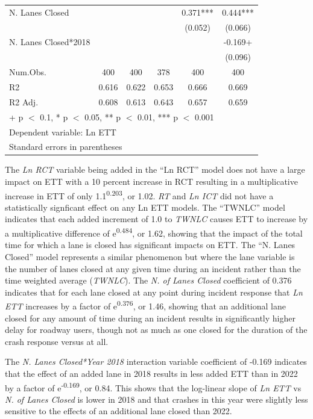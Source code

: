 \documentclass[
  letterpaper,
  authoryear]{elsarticle}
\begin{document}
\begin{table}
{\begin{tabular}[t]{lccccc}
N. Lanes Closed &  &  &  & 0.371*** & 0.444***\\
 &  &  &  & (0.052) & (0.066)\\
N. Lanes Closed*2018 &  &  &  &  & -0.169+\\
 &  &  &  &  & (0.096)\\
\midrule
Num.Obs. & 400 & 400 & 378 & 400 & 400\\
R2 & 0.616 & 0.622 & 0.653 & 0.666 & 0.669\\
R2 Adj. & 0.608 & 0.613 & 0.643 & 0.657 & 0.659\\
\bottomrule
\multicolumn{6}{l}{\rule{0pt}{1em}+ p $<$ 0.1, * p $<$ 0.05, ** p $<$ 0.01, *** p $<$ 0.001}\\
\multicolumn{6}{l}{\rule{0pt}{1em}Dependent variable: Ln ETT}\\
\multicolumn{6}{l}{\rule{0pt}{1em}Standard errors in parentheses}\\
\end{tabular}

}

\end{table}%

The \emph{Ln RCT} variable being added in the ``Ln RCT'' model does not
have a large impact on ETT with a 10 percent increase in RCT resulting
in a multiplicative increase in ETT of only 1.1\textsuperscript{0.203},
or 1.02. \emph{RT} and \emph{Ln ICT} did not have a statistically
signficant effect on any Ln ETT models. The ``TWNLC'' model indicates
that each added increment of 1.0 to \emph{TWNLC} causes ETT to increase
by a multiplicative difference of e\textsuperscript{0.484}, or 1.62,
showing that the impact of the total time for which a lane is closed has
significant impacts on ETT. The ``N. Lanes Closed'' model represents a
similar phenomenon but where the lane variable is the number of lanes
closed at any given time during an incident rather than the time
weighted average (\emph{TWNLC}). The \emph{N. of Lanes Closed}
coefficient of 0.376 indicates that for each lane closed at any point
during incident response that \emph{Ln ETT} increases by a factor of
e\textsuperscript{0.376}, or 1.46, showing that an additional lane
closed for any amount of time during an incident results in
significantly higher delay for roadway users, though not as much as one
closed for the duration of the crash response versus at all.

The \emph{N. Lanes Closed*Year 2018} interaction variable coefficient of
-0.169 indicates that the effect of an added lane in 2018 results in
less added ETT than in 2022 by a factor of e\textsuperscript{-0.169}, or
0.84. This shows that the log-linear slope of \emph{Ln ETT} vs \emph{N.
of Lanes Closed} is lower in 2018 and that crashes in this year were
slightly less sensitive to the effects of an additional lane closed than
2022.
\end{document}
